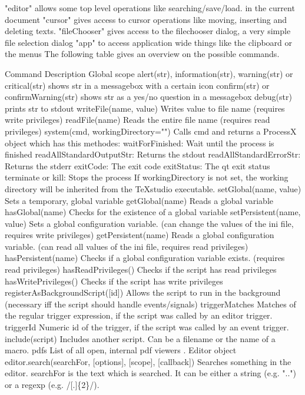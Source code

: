 \documentclass{article}
\begin{document}
	"editor" allows some top level operations like searching/save/load. in the current document
	"cursor" gives access to cursor operations like moving, inserting and deleting texts.
	"fileChooser" gives access to the filechooser dialog, a very simple file selection dialog
	"app" to access application wide things like the clipboard or the menus
	The following table gives an overview on the possible commands.
	
	Command	Description
	Global scope
	alert(str), information(str), warning(str) or critical(str)	shows str in a messagebox with a certain icon
	confirm(str) or confirmWarning(str)	shows str as a yes/no question in a messagebox
	debug(str)	prints str to stdout
	writeFile(name, value)	Writes value to file name (requires write privileges)
	readFile(name)	Reads the entire file name (requires read privileges)
	system(cmd, workingDirectory="")	Calls cmd and returns a ProcessX object which has this methodes:
	waitForFinished: Wait until the process is finished
	readAllStandardOutputStr: Returns the stdout
	readAllStandardErrorStr: Returns the stderr
	exitCode: The exit code
	exitStatus: The qt exit status
	terminate or kill: Stops the process
	If workingDirectory is not set, the working directory will be inherited from the TeXstudio executable.
	setGlobal(name, value)	Sets a temporary, global variable
	getGlobal(name)	Reads a global variable
	hasGlobal(name)	Checks for the existence of a global variable
	setPersistent(name, value)	Sets a global configuration variable. (can change the values of the ini file, requires write privileges)
	getPersistent(name)	Reads a global configuration variable. (can read all values of the ini file, requires read privileges)
	hasPersistent(name)	Checks if a global configuration variable exists. (requires read privileges)
	hasReadPrivileges()	Checks if the script has read privileges
	hasWritePrivileges()	Checks if the script has write privileges
	registerAsBackgroundScript([id])	Allows the script to run in the background (necessary iff the script should handle events/signals)
	triggerMatches	Matches of the regular trigger expression, if the script was called by an editor trigger.
	triggerId	Numeric id of the trigger, if the script was called by an event trigger.
	include(script)	Includes another script. Can be a filename or the name of a macro.
	pdfs	List of all open, internal pdf viewers .
	Editor object
	editor.search(searchFor, [options], [scope], [callback])	Searches something in the editor.
	searchFor is the text which is searched. It can be either a string (e.g. "..") or a regexp (e.g. /[.]\{2\}/).
\end{document}
